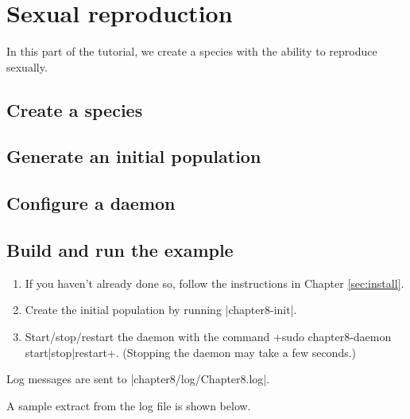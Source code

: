 \documentclass[a4paper,10pt]{report}
\begin{document}
\chapter{Sexual reproduction}
\label{sec:bug}

In this part of the tutorial, we create a species with the
ability to reproduce sexually.

\section{Create a species}
\label{sec:species3}



\section{Generate an initial population}
\label{sec:pop3}



\section{Configure a daemon}
\label{sec:daemon3}



\section{Build and run the example}
\label{sec:run3}

\begin{enumerate}
\item If you haven't already done so, follow the instructions in Chapter 
\ref{sec:install}.
\item Create the initial population by running |chapter8-init|.
\item Start/stop/restart the daemon with the command
\UndefineShortVerb{\|}
\DefineShortVerb{\+}
+sudo chapter8-daemon start|stop|restart+.
\UndefineShortVerb{\+}
\DefineShortVerb{\|}
(Stopping the daemon may take a few seconds.)
\end{enumerate}

Log messages are sent to |chapter8/log/Chapter8.log|.

A sample extract from the log file is shown below.
\end{document}
